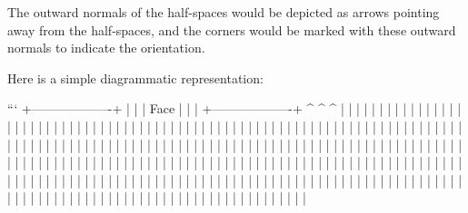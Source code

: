 The outward normals of the half-spaces would be depicted as arrows pointing away from the half-spaces, and the corners would be marked with these outward normals to indicate the orientation.

Here is a simple diagrammatic representation:

```
  +-------------------+
  |                   |
  |    Face            |
  |                   |
  +-------------------+
        ^     ^     ^
        |     |     |
        |     |     |
        |     |     |
        |     |     |
        |     |     |
        |     |     |
        |     |     |
        |     |     |
        |     |     |
        |     |     |
        |     |     |
        |     |     |
        |     |     |
        |     |     |
        |     |     |
        |     |     |
        |     |     |
        |     |     |
        |     |     |
        |     |     |
        |     |     |
        |     |     |
        |     |     |
        |     |     |
        |     |     |
        |     |     |
        |     |     |
        |     |     |
        |     |     |
        |     |     |
        |     |     |
        |     |     |
        |     |     |
        |     |     |
        |     |     |
        |     |     |
        |     |     |
        |     |     |
        |     |     |
        |     |     |
        |     |     |
        |     |     |
        |     |     |
        |     |     |
        |     |     |
        |     |     |
        |     |     |
        |     |     |
        |     |     |
        |     |     |
        |     |     |
        |     |     |
        |     |     |
        |     |     |
        |     |     |
        |     |     |
        |     |     |
        |     |     |
        |     |     |
        |     |     |
        |     |     |
        |     |     |
        |     |     |
        |     |     |
        |     |     |
        |     |     |
        |     |     |
        |     |     |
        |     |     |
        |     |     |
        |     |     |
        |     |     |
        |     |     |
        |     |     |
        |     |     |
        |     |     |
        |     |     |
        |     |     |
        |     |     |
        |     |     |
        |     |     |
        |     |     |
        |     |     |
        |     |     |
        |     |     |
        |     |     |
        |     |     |
        |     |     |
        |     |     |
        |     |     |
        |     |     |
        |     |     |
        |     |     |
        |     |     |
        |     |     |
        |     |     |
        |     |     |

